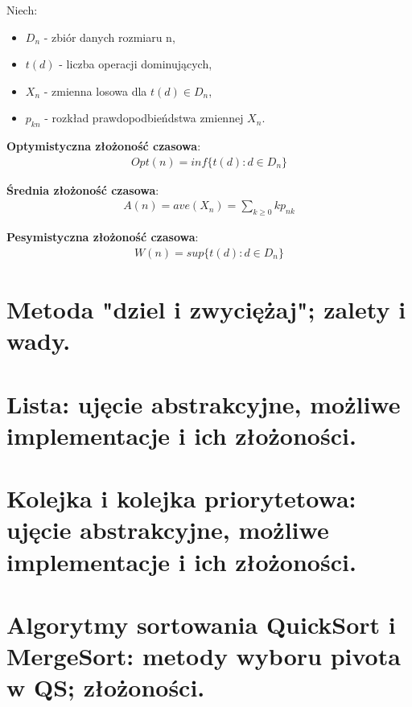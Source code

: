 \documentclass[12pt]{article}
\begin{document}
    \begin{definition}
        Niech:
        \begin{itemize}
            \item $D_n$ - zbiór danych rozmiaru n,
            \item $t(d)$ - liczba operacji dominujących,
            \item $X_n$ - zmienna losowa dla $t(d) \in D_n$,
            \item $p_{kn}$ - rozkład prawdopodbieńdstwa zmiennej $X_n$.
        \end{itemize}

        \textbf{Optymistyczna złożoność czasowa}:
        \begin{align*}
            Opt(n) = inf\{t(d) : d \in D_n\}
        \end{align*}

        \textbf{Średnia złożoność czasowa}:
        \begin{align*}
            A(n) = ave(X_n) = \sum_{k \geq 0}kp_{nk}
        \end{align*}

        \textbf{Pesymistyczna złożoność czasowa}:
        \begin{align*}
            W(n) = sup\{t(d) : d \in D_n\}
        \end{align*}
    \end{definition}

    \newpage

    \section{Metoda "dziel i zwyciężaj"; zalety i wady.}
    \section{Lista: ujęcie abstrakcyjne, możliwe implementacje i ich złożoności.}
    \section{Kolejka i kolejka priorytetowa: ujęcie abstrakcyjne, możliwe implementacje i ich złożoności.}

    \newpage

    \section{Algorytmy sortowania QuickSort i MergeSort: metody wyboru pivota w QS; złożoności.}
\end{document}
